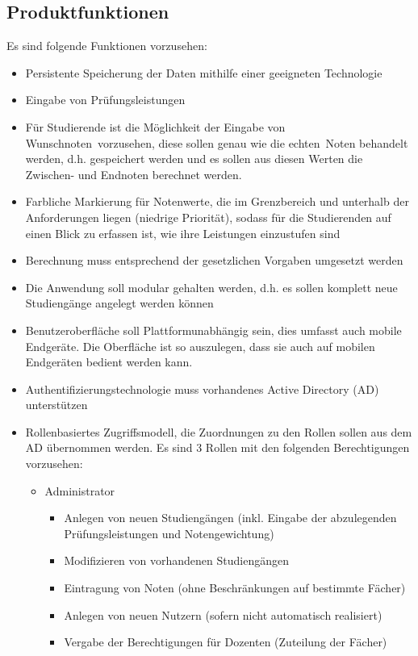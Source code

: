 \documentclass[12pt,a4paper,parskip]{scrreprt}
\begin{document}
\subsection{Produktfunktionen}
Es sind folgende Funktionen vorzusehen:
\begin{itemize}
\item Persistente Speicherung der Daten mithilfe einer geeigneten Technologie
\item Eingabe von Prüfungsleistungen
\item Für Studierende ist die Möglichkeit der Eingabe von \glqq Wunschnoten\grqq\ vorzusehen, diese sollen genau wie die \glqq echten\grqq\ Noten behandelt werden, d.h. gespeichert werden und es sollen aus diesen Werten die Zwischen- und Endnoten berechnet werden.
\item Farbliche Markierung für Notenwerte, die im Grenzbereich und unterhalb der Anforderungen liegen (niedrige Priorität), sodass für die Studierenden auf einen Blick zu erfassen ist, wie ihre Leistungen einzustufen sind
\item Berechnung muss entsprechend der gesetzlichen Vorgaben umgesetzt werden
\item Die Anwendung soll modular gehalten werden, d.h. es sollen komplett neue Studiengänge angelegt werden können
\item Benutzeroberfläche soll Plattformunabhängig sein, dies umfasst auch mobile Endgeräte. Die Oberfläche ist so auszulegen, dass sie auch auf mobilen Endgeräten bedient werden kann.
\item Authentifizierungstechnologie muss vorhandenes Active Directory (AD) unterstützen
\item Rollenbasiertes Zugriffsmodell, die Zuordnungen zu den Rollen sollen aus dem AD übernommen werden. 
Es sind 3 Rollen mit den folgenden Berechtigungen vorzusehen:
\begin{itemize}
\item Administrator
\begin{itemize}
\item Anlegen von neuen Studiengängen (inkl. Eingabe der abzulegenden Prüfungsleistungen und Notengewichtung)
\item Modifizieren von vorhandenen Studiengängen
\item Eintragung von Noten (ohne Beschränkungen auf bestimmte Fächer)
\item Anlegen von neuen Nutzern (sofern nicht automatisch realisiert)
\item Vergabe der Berechtigungen für Dozenten (Zuteilung der Fächer)

\end{itemize}
\end{itemize}
\end{itemize}
\end{document}
